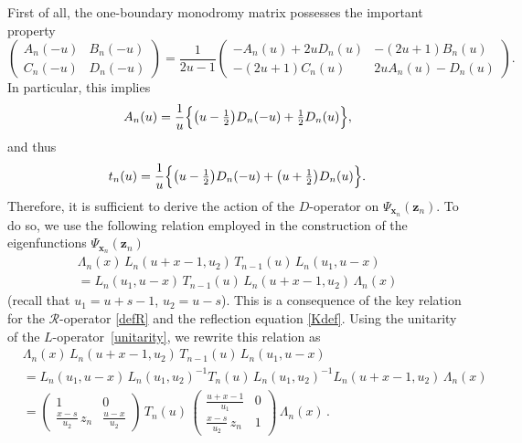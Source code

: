 \documentclass[a4paper,11pt]{article}
\numberwithin{equation}{section}
\begin{document}
First of all, the one-boundary monodromy matrix possesses the important property~\cite{Skl:Boundary}
\begin{equation} \nonumber
    \begin{pmatrix}
        A_n(-u) & B_n(-u) \\
        C_n(-u) & D_n(-u)
    \end{pmatrix} = \frac{1}{2u-1} \begin{pmatrix}
        -A_n(u)+2uD_n(u) & -(2u+1)B_n(u) \\
        -(2u+1)C_n(u) & 2uA_n(u)-D_n(u)
    \end{pmatrix} .
\end{equation}
In particular, this implies
\begin{equation*} 
    A_n(u) = \frac{1}{u}\Bigl\{ \bigl(u-\tfrac{1}{2}\bigr) D_n(-u) + \tfrac{1}{2} D_n(u) \Bigr\} ,
\end{equation*} 
and thus
\begin{equation} \label{tD}
    t_n(u) = \frac{1}{u}\Bigl\{ \bigl(u-\tfrac{1}{2}\bigr) D_n(-u) + \bigl(u + \tfrac{1}{2}\bigr) D_n(u) \Bigr\} .
\end{equation}  
Therefore, it is sufficient to derive the action of the $D$-operator on $\Psi_{\bm{x}_n}(\bm{z}_n)$. To do so, we use the following relation employed in the construction of the eigenfunctions $\Psi_{\bm{x}_n}(\bm{z}_n)$
\begin{multline*}
    \Lambda_n (x)\,
    L_{n}\left(u+x-1,u_{2}\right)\,T_{n-1}(u)\,
    L_{n}\left(u_{1},u-x\right) \\
    = L_{n}\left(u_1,u-x\right)\,T_{n-1}(u)\, 
    L_{n}\left(u+x-1,u_{2}\right)\,
    \Lambda_n(x)
\end{multline*}
(recall that $u_1=u+s-1$, $u_2=u-s$).
This is a consequence of the key relation for the $\mathcal{R}$-operator \eqref{defR} and the reflection equation \eqref{Kdef}. Using the unitarity of the $L$-operator~\eqref{unitarity}, we rewrite this relation as
\begin{align*}
	&
    \Lambda_n (x)\,
    L_{n}\left(u+x-1,u_{2}\right)\,T_{n-1}(u)\,
    L_{n}\left(u_{1},u-x\right) \\
    &
    = L_{n}\left(u_1,u-x\right)\, L_n\left(u_1,u_2\right)^{-1} T_{n}(u)\, 
    L_n\left(u_1,u_2\right)^{-1}L_{n}\left(u+x-1,u_{2}\right)\,
    \Lambda_n(x) \\
    &
    = \begin{pmatrix}
        1 & 0 \\
        \frac{x-s}{u_2}\,z_n & \frac{u-x}{u_2}
    \end{pmatrix} \, T_n(u) \, 
    \begin{pmatrix}
        \frac{u+x-1}{u_1} & 0 \\
        \frac{x-s}{u_2}\,z_n & 1    
    \end{pmatrix} \, \Lambda_n (x) \,.
\end{align*}
\end{document}
